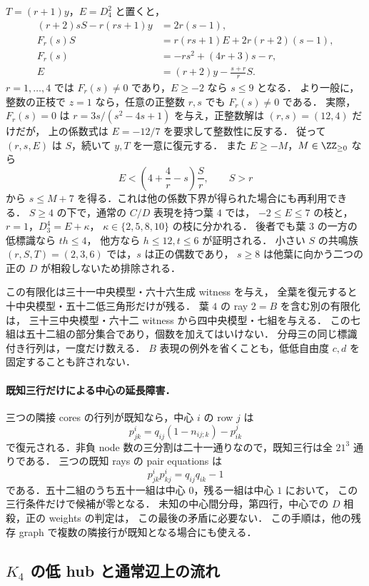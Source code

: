 $T=(r+1)y$，$E=D^2_4$ と置くと，
\begin{align*}
 (r+2)sS-r(rs+1)y&=2r(s-1),\\
 F_r(s)S&=r(rs+1)E+2r(r+2)(s-1),\\
 F_r(s)&=-rs^2+(4r+3)s-r,\\
 E&=(r+2)y-\frac{s+r}{r}S.
\end{align*}
$r=1,\ldots,4$ では $F_r(s)\ne0$ であり，$E\ge-2$ なら $s\le9$ となる．
より一般に，整数の正枝で $z=1$ なら，任意の正整数 $r,s$ でも $F_r(s)\ne0$ である．
実際，$F_r(s)=0$ は $r=3s/(s^2-4s+1)$ を与え，正整数解は $(r,s)=(12,4)$ だけだが，
上の係数式は $E=-12/7$ を要求して整数性に反する．
従って $(r,s,E)$ は $S$，続いて $y,T$ を一意に復元する．
また $E\ge-M$，$M\in\ZZ_{\ge0}$ なら
\[
 E<\left(4+\frac4r-s\right)\frac Sr,\qquad S>r
\]
から $s\le M+7$ を得る．これは他の係数下界が得られた場合にも再利用できる．
$S\ge4$ の下で，通常の $C/D$ 表現を持つ葉 $4$ では，
$-2\le E\le7$ の枝と，$r=1$，$D^4_3=E+\kappa$，
$\kappa\in\{2,5,8,10\}$ の枝に分かれる．
後者でも葉 $3$ の一方の低標識なら $th\le4$，
他方なら $h\le12,t\le6$ が証明される．
小さい $S$ の共鳴族 $(r,S,T)=(2,3,6)$ では，$s$ は正の偶数であり，
$s\ge8$ は他葉に向かう二つの正の $D$ が相殺しないため排除される．

この有限化は三十一中央模型・六十六生成 witness を与え，
全葉を復元すると十中央模型・五十二低三角形だけが残る．
葉 $4$ の ray $2=B$ を含む別の有限化は，
三十三中央模型・六十二 witness から四中央模型・七組を与える．
この七組は五十二組の部分集合であり，個数を加えてはいけない．
分母三の同じ標識付き行列は，一度だけ数える．
$B$ 表現の例外を省くことも，低低自由度 $c,d$ を固定することも許されない．

\paragraph{既知三行だけによる中心の延長障害．}
三つの隣接 cores の行列が既知なら，中心 $i$ の row $j$ は
\[
 p^i_{jk}=q_{ij}(1-n_{ij;k})-p^j_{ik}
\]
で復元される．非負 node 数の三分割は二十一通りなので，既知三行は全 $21^3$ 通りである．
三つの既知 rays の pair equations は
\[
 p^i_{jk}p^i_{kj}=q_{ij}q_{ik}-1
\]
である．五十二組のうち五十一組は中心 $0$，残る一組は中心 $1$ において，
この三行条件だけで候補が零となる．
未知の中心間分母，第四行，中心での $D$ 相殺，正の weights の判定は，
この最後の矛盾に必要ない．
この手順は，他の残存 graph で複数の隣接行が既知となる場合にも使える．

\subsection{\texorpdfstring{$K_4$}{K4} の低 hub と通常辺上の流れ}
\label{ng16:k4-flow}

